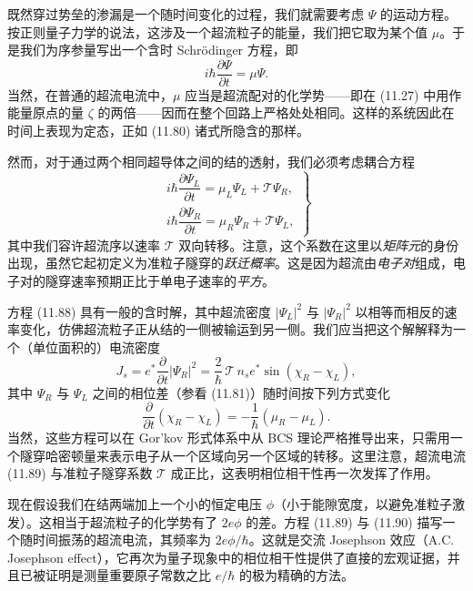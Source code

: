 既然穿过势垒的渗漏是一个随时间变化的过程，我们就需要考虑 $\Psi$ 的运动方程。按正则量子力学的说法，这涉及一个超流粒子的能量，我们把它取为某个值 $\mu$。于是我们为序参量写出一个含时 Schrödinger 方程，即
\begin{equation*}
i\hbar\frac{\partial\Psi}{\partial t} = \mu\Psi.
\tag{11.87}
\end{equation*}
当然，在普通的超流电流中，$\mu$ 应当是超流配对的化学势——即在 (11.27) 中用作能量原点的量 $\zeta$ 的两倍——因而在整个回路上严格处处相同。这样的系统因此在时间上表现为定态，正如 (11.80) 诸式所隐含的那样。

然而，对于通过两个相同超导体之间的结的透射，我们必须考虑耦合方程
\begin{equation*}
\left.\begin{array}{l}
i\hbar\dfrac{\partial\Psi_L}{\partial t} = \mu_L\Psi_L + \mathcal{T}\Psi_R,\\[8pt]
i\hbar\dfrac{\partial\Psi_R}{\partial t} = \mu_R\Psi_R + \mathcal{T}\Psi_L,
\end{array}\right\}
\tag{11.88}
\end{equation*}
其中我们容许超流序以速率 $\mathcal{T}$ 双向转移。注意，这个系数在这里以\emph{矩阵元}的身份出现，虽然它起初定义为准粒子隧穿的\emph{跃迁概率}。这是因为超流由\emph{电子对}组成，电子对的隧穿速率预期正比于单电子速率的\emph{平方}。

方程 (11.88) 具有一般的含时解，其中超流密度 $|\Psi_L|^{2}$ 与 $|\Psi_R|^{2}$ 以相等而相反的速率变化，仿佛超流粒子正从结的一侧被输运到另一侧。我们应当把这个解解释为一个（单位面积的）电流密度
\begin{equation*}
J_s = e^{*}\frac{\partial}{\partial t}|\Psi_R|^{2} = \frac{2}{\hbar}\,\mathcal{T}\,n_s e^{*}\sin(\chi_R - \chi_L),
\tag{11.89}
\end{equation*}
其中 $\Psi_R$ 与 $\Psi_L$ 之间的相位差（参看 (11.81)）随时间按下列方式变化
\begin{equation*}
\frac{\partial}{\partial t}(\chi_R - \chi_L) = -\frac{1}{\hbar}(\mu_R - \mu_L).
\tag{11.90}
\end{equation*}
当然，这些方程可以在 Gor'kov 形式体系中从 BCS 理论严格推导出来，只需用一个隧穿哈密顿量来表示电子从一个区域向另一个区域的转移。这里注意，超流电流 (11.89) 与准粒子隧穿系数 $\mathcal{T}$ 成正比，这表明相位相干性再一次发挥了作用。

现在假设我们在结两端加上一个小的恒定电压 $\phi$（小于能隙宽度，以避免准粒子激发）。这相当于超流粒子的化学势有了 $2e\phi$ 的差。方程 (11.89) 与 (11.90) 描写一个随时间振荡的超流电流，其频率为 $2e\phi/\hbar$。这就是交流 Josephson 效应（A.C. Josephson effect），它再次为量子现象中的相位相干性提供了直接的宏观证据，并且已被证明是测量重要原子常数之比 $e/\hbar$ 的极为精确的方法。

